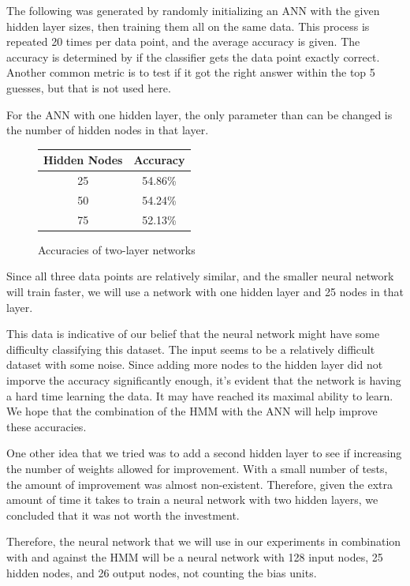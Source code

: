 \documentclass[11pt,a4paper,twocolumn]{article}
\begin{document}
The following was generated by randomly initializing an ANN with the given hidden layer sizes, then
training them all on the same data. This process is repeated 20 times per data point, and the
average accuracy is given. The accuracy is determined by if the classifier gets the data point
exactly correct. Another common metric is to test if it got the right answer within the top 5
guesses, but that is not used here.

For the ANN with one hidden layer, the only parameter than can be changed is the number of hidden nodes in that layer.

\begin{figure}[h]
    \caption{Accuracies of two-layer networks}
    \centering
    \begin{tabular}{|c|c|}
        \hline 
        Hidden Nodes & Accuracy \\ 
        \hline 
        25 & 54.86\% \\ 
        \hline 
        50 & 54.24\% \\ 
        \hline 
        75 & 52.13\% \\ 
        \hline 
    \end{tabular} 
\end{figure}

Since all three data points are relatively similar, and the smaller neural
network will train faster, we will use a network with one hidden layer and 25 nodes
in that layer.

This data is indicative of our belief that the neural network might have some
difficulty classifying this dataset. The input seems to be a relatively
difficult dataset with some noise. Since adding more nodes to the hidden layer
did not imporve the accuracy significantly enough, it's evident that the
network is having a hard time learning the data. It may have reached its
maximal ability to learn. We hope that the combination of the HMM with the ANN
will help improve these accuracies.

One other idea that we tried was to add a second hidden layer to see if
increasing the number of weights allowed for improvement. With a small number
of tests, the amount of improvement was almost non-existent. Therefore, given
the extra amount of time it takes to train a neural network with two hidden
layers, we concluded that it was not worth the investment.

Therefore, the neural network that we will use in our experiments in
combination with and against the HMM will be a neural network with 128 input
nodes, 25 hidden nodes, and 26 output nodes, not counting the bias units.
\end{document}

